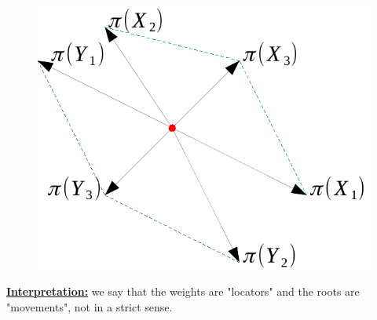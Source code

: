 \documentclass[../main.tex]{subfiles}
\begin{document}
\begin{figure}[h!]
    \centering
    \includegraphics{images/commrelations.pdf}
    \caption*{}
\end{figure}

\underline{\textbf{Interpretation:}} we say that the weights are "locators" and the roots are "movements", not in a strict sense. 
\end{document}
